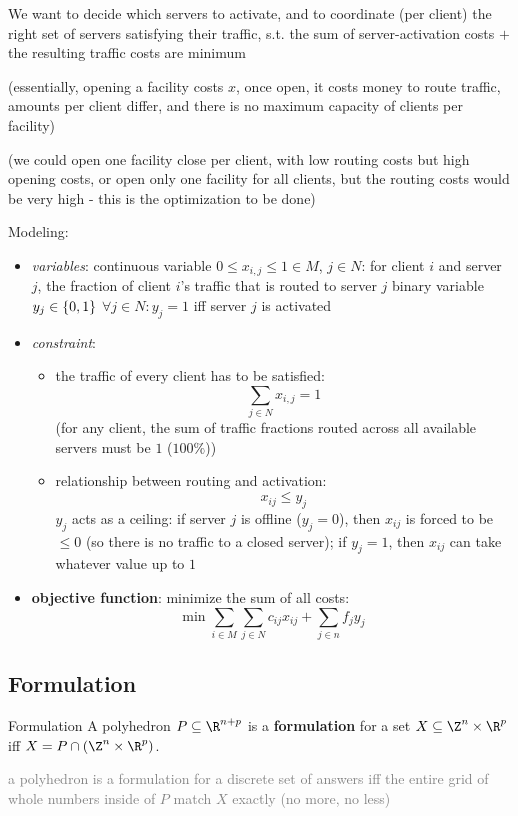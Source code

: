\documentclass[a4paper, 11pt]{report}
\begin{document}
We want to decide which servers to activate, and to coordinate (per client) the right set of servers satisfying their traffic, s.t. the sum of server-activation costs $+$ the resulting traffic costs are minimum

(essentially, opening a facility costs $x$, once open, it costs money to route traffic, amounts per client differ, and there is no maximum capacity of clients per facility)

(we could open one facility close per client, with low routing costs but high opening costs, or open only one facility for all clients, but the routing costs would be very high - this is the optimization to be done)

Modeling:
\begin{itemize}
    \item \textit{variables}:
        \subitem continuous variable $0 \leq x_{i,j} \leq 1 \in M$, $j \in N$: for client $i$ and server $j$, the fraction of client $i$'s traffic that is routed to server $j$
        \subitem binary variable $y_{j} \in \set{0,1}$ $\forall j \in N: y_{j} = 1 $ iff server $j$ is activated
    \item \textit{constraint}: 
        \begin{itemize}
            \item the traffic of every client has to be satisfied:
                $$ \sum_{j \in N} x_{i,j} = 1  $$
                \subitem (for any client, the sum of traffic fractions routed across all available servers must be $1$ ($100\%$))
            \item relationship between routing and activation:
                $$ x_{ij} \leq y_{j} $$
                \subitem $y_{j}$ acts as a ceiling: if server $j$ is offline ($y_{j} = 0$), then $x_{ij}$ is forced to be $\leq 0$ (so there is no traffic to a closed server); if $y_{j} = 1$, then $x_{ij}$ can take whatever value up to $1$
        \end{itemize}
    \item \textbf{objective function}: minimize the sum of all costs:
        $$ \min \sum_{i \in M} \sum_{j \in N} c_{ij}x_{ij}+ \sum_{j \in n} f_{j}y_{j}$$
\end{itemize}

\subsection{Formulation}

\begin{defframe}{Formulation}{}
    A polyhedron $P \subseteq \R^{n+p}$ is a \textbf{formulation} for a set $X \subseteq \Z^{n}\times \R^{p}$ iff $X = P \cap (\Z^{n} \times \R^{p})$.

    \textcolor{gray}{a polyhedron is a formulation for a discrete set of answers iff the entire grid of whole numbers inside of $P$ match $X$ exactly (no more, no less)}
\end{defframe}
\end{document}

